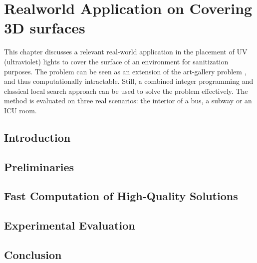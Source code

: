 
\chapter{Realworld Application on Covering 3D surfaces}
\thispagestyle{myheadings}

This chapter discusses a relevant real-world application in the placement of UV (ultraviolet) lights 
to cover the surface of an environment for sanitization purposes. The problem can be seen as an extension
of the art-gallery problem \cite{o1987art}, and thus computationally intractable.
Still, a combined integer programming and classical local search approach can be used to
solve the problem effectively. The method is evaluated on three real scenarios: 
the interior of a bus, a subway or an ICU room. 


\def\spoc{{\texttt{{SPOC}}}\xspace}
\def\osg{{\texttt{{OSG}}}\xspace}

\section{Introduction}

\label{sec:surf-intro}

\section{Preliminaries}\label{sec:surf-preliminary}



%

\section{Fast Computation of High-Quality Solutions}\label{sec:surf-algorithm}


\section{Experimental Evaluation}\label{sec:surf-evaluation}


\vspace{-1mm}
\section{Conclusion}\label{sec:surf-conclusion}


